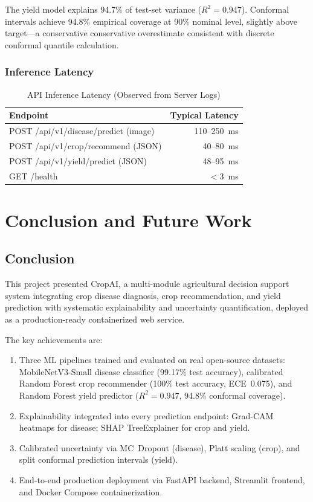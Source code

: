 \documentclass[12pt,a4paper]{report}
\begin{document}
The yield model explains 94.7\% of test-set variance ($R^2=0.947$). Conformal intervals achieve 94.8\% empirical coverage at 90\% nominal level, slightly above target---a conservative conservative overestimate consistent with discrete conformal quantile calculation.

\subsection{Inference Latency}
\begin{table}[h!]
\centering
\renewcommand{\arraystretch}{1.3}
\caption{API Inference Latency (Observed from Server Logs)}
\label{tab:latency}
\begin{tabular}{|L{7.5cm}|r|}
\hline
\textbf{Endpoint} & \textbf{Typical Latency} \\
\hline
POST /api/v1/disease/predict (image) & 110--250~ms \\
\hline
POST /api/v1/crop/recommend (JSON) & 40--80~ms \\
\hline
POST /api/v1/yield/predict (JSON) & 48--95~ms \\
\hline
GET /health & $<$3~ms \\
\hline
\end{tabular}
\end{table}

\chapter{Conclusion and Future Work}

\section{Conclusion}
This project presented CropAI, a multi-module agricultural decision support system integrating crop disease diagnosis, crop recommendation, and yield prediction with systematic explainability and uncertainty quantification, deployed as a production-ready containerized web service.

The key achievements are:
\begin{enumerate}[leftmargin=*]
  \item Three ML pipelines trained and evaluated on real open-source datasets: MobileNetV3-Small disease classifier (99.17\% test accuracy), calibrated Random Forest crop recommender (100\% test accuracy, ECE~0.075), and Random Forest yield predictor ($R^2=0.947$, 94.8\% conformal coverage).
  \item Explainability integrated into every prediction endpoint: Grad-CAM heatmaps for disease; SHAP TreeExplainer for crop and yield.
  \item Calibrated uncertainty via MC~Dropout (disease), Platt scaling (crop), and split conformal prediction intervals (yield).
  \item End-to-end production deployment via FastAPI backend, Streamlit frontend, and Docker Compose containerization.
\end{enumerate}
\end{document}
